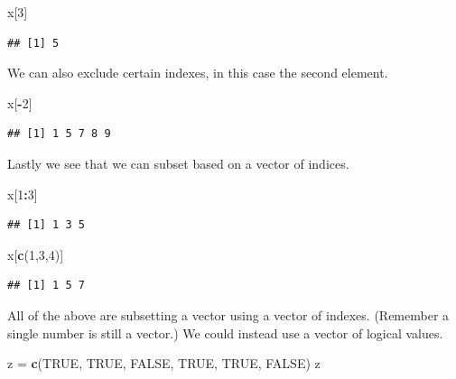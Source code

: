 \documentclass[]{book}
\newenvironment{Shaded}{\begin{snugshade}}{\end{snugshade}}
\newcommand{\KeywordTok}[1]{\textcolor[rgb]{0.13,0.29,0.53}{\textbf{#1}}}
\newcommand{\DecValTok}[1]{\textcolor[rgb]{0.00,0.00,0.81}{#1}}
\newcommand{\StringTok}[1]{\textcolor[rgb]{0.31,0.60,0.02}{#1}}
\newcommand{\OtherTok}[1]{\textcolor[rgb]{0.56,0.35,0.01}{#1}}
\newcommand{\OperatorTok}[1]{\textcolor[rgb]{0.81,0.36,0.00}{\textbf{#1}}}
\newcommand{\NormalTok}[1]{#1}
\begin{document}
\begin{Shaded}
\begin{Highlighting}[]
\NormalTok{x[}\DecValTok{3}\NormalTok{]}
\end{Highlighting}
\end{Shaded}

\begin{verbatim}
## [1] 5
\end{verbatim}

We can also exclude certain indexes, in this case the second element.

\begin{Shaded}
\begin{Highlighting}[]
\NormalTok{x[}\OperatorTok{-}\DecValTok{2}\NormalTok{]}
\end{Highlighting}
\end{Shaded}

\begin{verbatim}
## [1] 1 5 7 8 9
\end{verbatim}

Lastly we see that we can subset based on a vector of indices.

\begin{Shaded}
\begin{Highlighting}[]
\NormalTok{x[}\DecValTok{1}\OperatorTok{:}\DecValTok{3}\NormalTok{]}
\end{Highlighting}
\end{Shaded}

\begin{verbatim}
## [1] 1 3 5
\end{verbatim}

\begin{Shaded}
\begin{Highlighting}[]
\NormalTok{x[}\KeywordTok{c}\NormalTok{(}\DecValTok{1}\NormalTok{,}\DecValTok{3}\NormalTok{,}\DecValTok{4}\NormalTok{)]}
\end{Highlighting}
\end{Shaded}

\begin{verbatim}
## [1] 1 5 7
\end{verbatim}

All of the above are subsetting a vector using a vector of indexes.
(Remember a single number is still a vector.) We could instead use a
vector of logical values.

\begin{Shaded}
\begin{Highlighting}[]
\NormalTok{z =}\StringTok{ }\KeywordTok{c}\NormalTok{(}\OtherTok{TRUE}\NormalTok{, }\OtherTok{TRUE}\NormalTok{, }\OtherTok{FALSE}\NormalTok{, }\OtherTok{TRUE}\NormalTok{, }\OtherTok{TRUE}\NormalTok{, }\OtherTok{FALSE}\NormalTok{)}
\NormalTok{z}
\end{Highlighting}
\end{Shaded}
\end{document}
